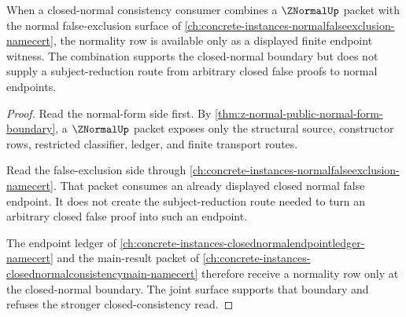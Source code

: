 \begin{theorem}
\label{thm:z-normal-false-exclusion-boundary}
When a closed-normal consistency consumer combines a $\ZNormalUp$ packet with the normal false-exclusion surface of \autoref{ch:concrete-instances-normalfalseexclusion-namecert}, the normality row is available only as a displayed finite endpoint witness. The combination supports the closed-normal boundary but does not supply a subject-reduction route from arbitrary closed false proofs to normal endpoints.
\end{theorem}
\begin{proof}
Read the normal-form side first. By \autoref{thm:z-normal-public-normal-form-boundary}, a $\ZNormalUp$ packet exposes only the structural source, constructor rows, restricted classifier, ledger, and finite transport routes.

Read the false-exclusion side through \autoref{ch:concrete-instances-normalfalseexclusion-namecert}. That packet consumes an already displayed closed normal false endpoint. It does not create the subject-reduction route needed to turn an arbitrary closed false proof into such an endpoint.

The endpoint ledger of \autoref{ch:concrete-instances-closednormalendpointledger-namecert} and the main-result packet of \autoref{ch:concrete-instances-closednormalconsistencymain-namecert} therefore receive a normality row only at the closed-normal boundary. The joint surface supports that boundary and refuses the stronger closed-consistency read.
\end{proof}
